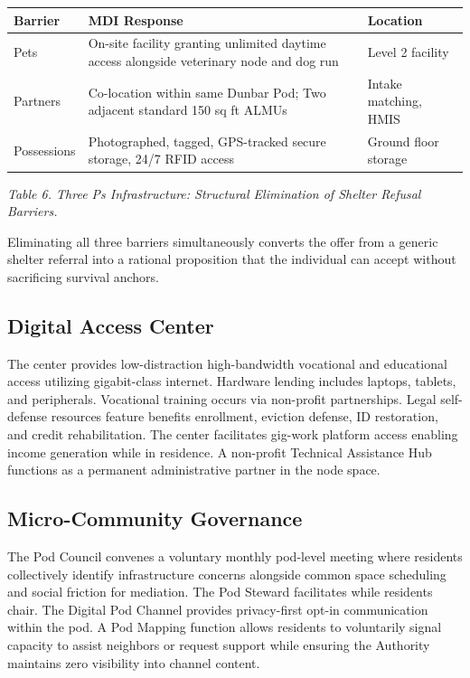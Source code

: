 \documentclass[12pt, letterpaper]{article}
\begin{document}
{\singlespacing
\begin{tabularx}{\textwidth}{@{}lXl@{}}
\toprule
\rowcolor{rowgray}
Barrier & MDI Response & Location \\
\midrule
Pets & On-site facility granting unlimited daytime access alongside veterinary node and dog run & Level 2 facility \\
\rowcolor{rowgray}
Partners & Co-location within same Dunbar Pod; Two adjacent standard 150 sq ft ALMUs & Intake matching, HMIS \\
Possessions & Photographed, tagged, GPS-tracked secure storage, 24/7 RFID access & Ground floor storage \\
\bottomrule
\end{tabularx}\par
\vspace{8pt}
\noindent\textit{Table 6. Three Ps Infrastructure: Structural Elimination of Shelter Refusal Barriers.}
\par}
Eliminating all three barriers simultaneously converts the offer from a generic shelter referral into a rational proposition that the individual can accept without sacrificing survival anchors.

\subsection{Digital Access Center}

The center provides low-distraction high-bandwidth vocational and educational access utilizing gigabit-class internet. Hardware lending includes laptops, tablets, and peripherals. Vocational training occurs via non-profit partnerships. Legal self-defense resources feature benefits enrollment, eviction defense, ID restoration, and credit rehabilitation. The center facilitates gig-work platform access enabling income generation while in residence. A non-profit Technical Assistance Hub functions as a permanent administrative partner in the node space.

\subsection{Micro-Community Governance}

The Pod Council convenes a voluntary monthly pod-level meeting where residents collectively identify infrastructure concerns alongside common space scheduling and social friction for mediation. The Pod Steward facilitates while residents chair. The Digital Pod Channel provides privacy-first opt-in communication within the pod. A Pod Mapping function allows residents to voluntarily signal capacity to assist neighbors or request support while ensuring the Authority maintains zero visibility into channel content.
\end{document}
